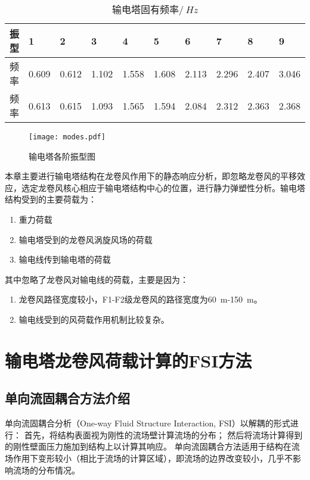 \begin{table}[!htbp]
	\centering
	\caption{输电塔固有频率$/\SI{}{Hz}$}
	\label{tab:freq}
	\begin{tabu} to 1.0\textwidth {X[1.5,c] X[1,c] X[1,c] X[1,c] X[1,c] X[1,c] X[1,c] X[1,c] X[1,c] X[1,c]}
		\toprule
		振型                    & 1     & 2     & 3     & 4     & 5     & 6     & 7     & 8     & 9     \\
		\midrule
		频率\cite{ren2010tower} & 0.609 & 0.612 & 1.102 & 1.558 & 1.608 & 2.113 & 2.296 & 2.407 & 3.046 \\
		频率                    & 0.613 & 0.615 & 1.093 & 1.565 & 1.594 & 2.084 & 2.312 & 2.363 & 2.368 \\
		\bottomrule
	\end{tabu}
\end{table}

\begin{figure}[!htbp]
	\centering
	\texttt{[image: modes.pdf]}
	\caption{输电塔各阶振型图}
	\label{fig:modes}
\end{figure}

本章主要进行输电塔结构在龙卷风作用下的静态响应分析，即忽略龙卷风的平移效应，选定龙卷风核心相应于输电塔结构中心的位置，进行静力弹塑性分析。输电塔结构受到的主要荷载为：
\begin{enumerate}
	\item 重力荷载
	\item 输电塔受到的龙卷风涡旋风场的荷载
	\item 输电线传到输电塔的荷载
\end{enumerate}
其中忽略了龙卷风对输电线的荷载，主要是因为：
\begin{enumerate}
	\item 龙卷风路径宽度较小，F1-F2级龙卷风的路径宽度为\SI{60}{m}-\SI{150}{m}。
	\item 输电线受到的风荷载作用机制比较复杂。
\end{enumerate}

\section{输电塔龙卷风荷载计算的FSI方法}

\subsection{单向流固耦合方法介绍}
单向流固耦合分析（One-way Fluid Structure Interaction, FSI）以解耦的形式进行\cite{benra2011comparison}\cite{qian2008fsi}：
首先，将结构表面视为刚性的流场壁计算流场的分布；
然后将流场计算得到的刚性壁面压力施加到结构上以计算其响应。
单向流固耦合方法适用于结构在流场作用下变形较小（相比于流场的计算区域），即流场的边界改变较小，几乎不影响流场的分布情况。

